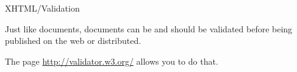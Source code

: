 %
\begin{frame}{XHTML/Validation}

Just like \XML documents, \XHTML documents can be and should be
validated before being published on the web or distributed.

\bigskip

The page \url{http://validator.w3.org/} allows you to do that.

\end{frame}
